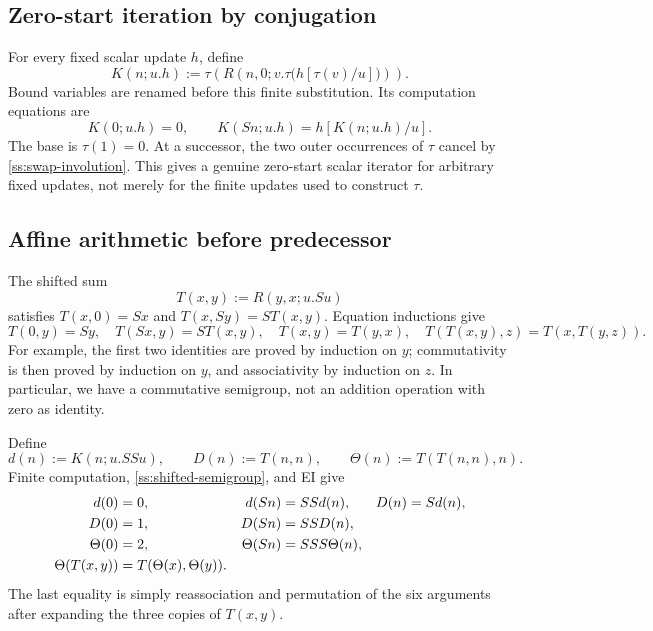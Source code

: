 \subsection{Zero-start iteration by conjugation}

For every fixed scalar update $h$, define
\begin{equation}
 K(n;u.h):=
 \tau\!\left(R\left(n,0;
       v.\tau\bigl(h[\tau(v)/u]\bigr)\right)\right).
 \label{ss:zero-iterator}
\end{equation}
Bound variables are renamed before this finite substitution.  Its
computation equations are
\begin{equation}
 K(0;u.h)=0,\qquad
 K(Sn;u.h)=h[K(n;u.h)/u].
 \label{ss:k-computation}
\end{equation}
The base is $\tau(1)=0$.  At a successor, the two outer occurrences
of $\tau$ cancel by \eqref{ss:swap-involution}.
This gives a genuine zero-start scalar iterator for arbitrary fixed
updates, not merely for the finite updates used to construct $\tau$.

\subsection{Affine arithmetic before predecessor}

The shifted sum
\[
 T(x,y):=R(y,x;u.Su)
\]
satisfies $T(x,0)=Sx$ and $T(x,Sy)=S T(x,y)$.
Equation inductions give
\begin{equation}
 T(0,y)=Sy,\quad T(Sx,y)=S T(x,y),\quad
 T(x,y)=T(y,x),\quad
 T(T(x,y),z)=T(x,T(y,z)).
 \label{ss:shifted-semigroup}
\end{equation}
For example, the first two identities are proved by induction on $y$;
commutativity is then proved by induction on $y$, and associativity by
induction on $z$.  In particular, we have a commutative semigroup, not
an addition operation with zero as identity.

Define
\[
 d(n):=K(n;u.SSu),\qquad D(n):=T(n,n),\qquad
 \Theta(n):=T(T(n,n),n).
\]
Finite computation, \eqref{ss:shifted-semigroup}, and EI give
\begin{align}
 d(0)&=0,& d(Sn)&=SSd(n),&D(n)&=Sd(n),\notag\\
 D(0)&=1,&D(Sn)&=SSD(n),\notag\\
 \Theta(0)&=2,&\Theta(Sn)&=SSS\Theta(n),\notag\\
 \Theta(T(x,y))&=T(\Theta(x),\Theta(y)).
 \label{ss:affine-laws}
\end{align}
The last equality is simply reassociation and permutation of the six
arguments after expanding the three copies of $T(x,y)$.

